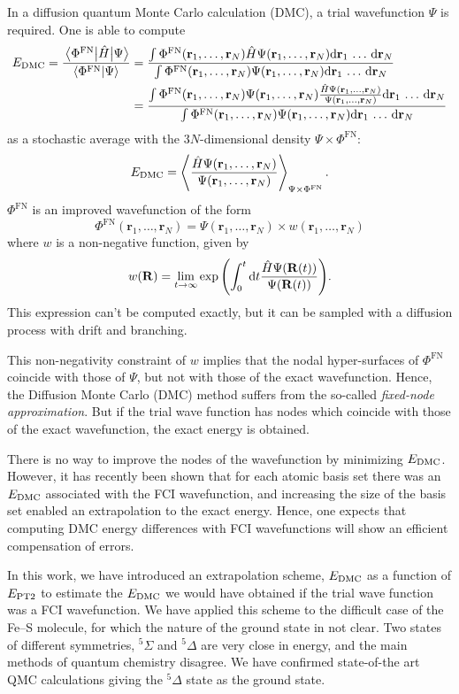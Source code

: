 \documentclass[./thesis.tex]{subfiles}
\begin{document}
\newcommand{\rn}{\mathbf{r}_1,\dots,\mathbf{r}_N}
\newcommand{\drn}{\text{d}\mathbf{r}_1\,\dots\,\text{d}\mathbf{r}_N}
In a diffusion quantum Monte Carlo calculation (DMC), a trial wavefunction
$\Psi$ is required. One is able to compute
\begin{align}
  \EDMC = \frac{\Hij{\Phi^{\text{FN}}}{\Psi}}{\braket{\Phi^{\text{FN}}}{\Psi}} & = 
  \frac{\int \Phi^{\text{FN}}(\rn) {\hat H}\Psi(\rn) \drn}{\int \Phi^{\text{FN}}(\rn)\Psi(\rn) \drn} \\
  & = \frac{\int \Phi^{\text{FN}}(\rn)\Psi(\rn) \frac{{\hat H}\Psi(\rn)}{\Psi(\rn)} \drn}{\int \Phi^{\text{FN}}(\rn)\Psi(\rn) \drn} 
\end{align}
as a stochastic average with the $3N$-dimensional density $\Psi \times \Phi^{\text{FN}}$:
\begin{equation}
  \EDMC = \left \langle \frac{{\hat H}\Psi(\rn)}{\Psi(\rn)} \right \rangle_{\Psi \times \Phi^{\text{FN}}}.
\end{equation}
$\Phi^{\text{FN}}$ is an improved wavefunction of the form
\begin{equation}
\Phi^{\text{FN}}(\rn)  = \Psi(\rn) \times w (\rn)
\end{equation}
where $w$ is a non-negative function, given by
\begin{equation}
w(\mathbf{R}) = \lim_{t \rightarrow \infty} \exp \qty( \int_0^t \text{d}t \frac{{\hat H}\Psi(\mathbf{R}(t))}{\Psi(\mathbf{R}(t))} ).
\end{equation}
This expression can't be computed exactly, but it can be sampled with a diffusion
process with drift and branching.\cite{Hammond_1994}

This non-negativity constraint of $w$ implies that the nodal
hyper-surfaces of $\Phi^{\text{FN}}$ coincide with those of $\Psi$, but not with
those of the exact wavefunction. Hence, the Diffusion Monte Carlo (DMC) method
suffers from the so-called \emph{fixed-node approximation}. But if the trial wave
function has nodes which coincide with those of the exact wavefunction, the
exact energy is obtained.

There is no way to improve the nodes of the wavefunction by minimizing $E_\text{DMC}$.
However, it has recently been shown\cite{Caffarel_2016} that for each atomic basis
set there was an $E_\text{DMC}$ associated with the FCI wavefunction, and increasing the
size of the basis set enabled an extrapolation to the exact energy.
Hence, one expects that computing DMC energy differences with FCI wavefunctions will
show an efficient compensation of errors.

In this work, we have introduced an extrapolation scheme, $E_\text{DMC}$ as a function
of $E_\text{PT2}$ to estimate the $E_\text{DMC}$ we would have obtained if the trial wave
function was a FCI wavefunction. We have applied this scheme to the difficult
case of the Fe--S molecule, for which the nature of the ground state in not
clear. Two states of different symmetries, $^5\Sigma$ and $^5\Delta$ are very
close in energy, and the main methods of quantum chemistry disagree.
We have confirmed state-of-the art QMC calculations giving the $^5\Delta$ state
as the ground state.\cite{Haghighi_Mood_2017}



\end{document}
